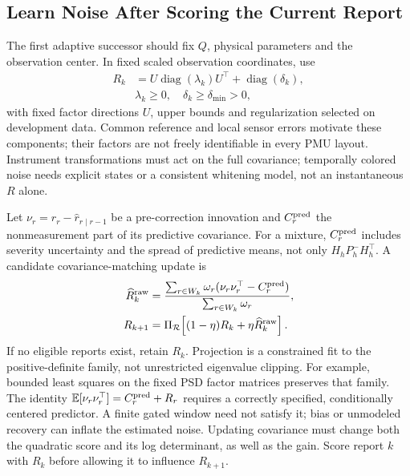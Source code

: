 \subsection{Learn Noise After Scoring the Current Report}
The first adaptive successor should fix $Q$, physical parameters and
the observation center. In fixed scaled observation coordinates, use
\begin{align}
 R_k&=U\operatorname{diag}(\lambda_k)U^\top+
       \operatorname{diag}(\delta_k),\nonumber\\
 &\lambda_k\ge0,\quad\delta_k\ge\delta_{\min}>0,
 \label{eq:adaptive-noise-family}
\end{align}
with fixed factor directions $U$, upper bounds and regularization selected
on development data. Common reference and local sensor errors motivate
these components; their factors are not freely identifiable in every
PMU layout. Instrument transformations must act on the full covariance;
temporally colored noise needs explicit states or a consistent whitening
model, not an instantaneous $R$ alone.

Let $\nu_r=r_r-\widehat r_{r\mid r-1}$ be a pre-correction innovation and
$C_r^{\rm pred}$ the nonmeasurement part of its predictive covariance.
For a mixture, $C_r^{\rm pred}$ includes severity uncertainty and the
spread of predictive means, not only $H_hP^-_hH_h^\top$.
A candidate covariance-matching update is
\begin{align}
 \widehat R_k^{\rm raw}
 &=\frac{\sum_{r\in W_k}\omega_r
       (\nu_r\nu_r^\top-C_r^{\rm pred})}{\sum_{r\in W_k}\omega_r},\nonumber\\
 R_{k+1}&=\Pi_{\mathcal R}\!\left[(1-\eta)R_k+
                          \eta\widehat R_k^{\rm raw}\right].
 \label{eq:adaptive-noise-update}
\end{align}
If no eligible reports exist, retain $R_k$. Projection is a constrained
fit to the positive-definite family, not unrestricted eigenvalue clipping.
For example, bounded least squares on the fixed PSD factor matrices
preserves that family. The identity
$\mathbb E[\nu_r\nu_r^\top]=C_r^{\rm pred}+R_r$ requires a correctly
specified, conditionally centered predictor. A finite gated window need
not satisfy it; bias or unmodeled recovery can inflate the estimated noise.
Updating covariance must change both the quadratic score and its log
determinant, as well as the gain. Score report $k$ with $R_k$ before
allowing it to influence $R_{k+1}$.

